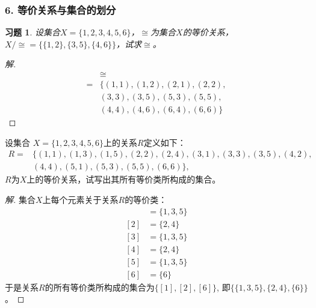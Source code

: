 \documentclass{beamer}
\newtheorem*{Exercise}{习题}
\begin{document}
\begin{CJK*}{UTF8}{gbsn}
\begin{frame}
\end{frame}
\begin{frame}
  \frametitle{6. 等价关系与集合的划分}
  \begin{Exercise}
    设集合$X=\{1,2,3,4,5,6\}$，$\cong$为集合$X$的等价关系，$X/\cong=\{\{1,2\},\{3,5\},\{4,6\}\}$，试求$\cong$。
  \end{Exercise}\pause
  \begin{proof}[解]
    \begin{align*}
      &\cong\\
      =&\{(1,1),(1,2),(2,1),(2,2),\\
      &(3,3),(3,5),(5,3),(5,5),\\
      &(4,4),(4,6),(6,4),(6,6)\}
    \end{align*}
  \end{proof}
\end{frame}
\begin{frame}
  \begin{Ex}
    设集合
    $X=\{1,2,3,4,5,6 \}$上的关系$R$定义如下：
    \begin{align*}
      R=&\{(1,1),(1,3),(1,5),(2,2),(2,4),(3,1),(3,3),(3,5),(4,2),\\
      &(4,4),(5,1),(5,3),(5,5),(6,6)\},
    \end{align*}
      $R$为$X$上的等价关系，试写出其所有等价类所构成的集合。
    \end{Ex}
    {\small
    \begin{proof}[解]
      集合$X$上每个元素关于关系$R$的等价类：
      \begin{align*}
        [1]&=\{1,3,5\}\\
        [2]&=\{2,4\}\\
        [3]&=\{1,3,5\}\\
        [4]&=\{2,4\}\\
        [5]&=\{1,3,5\}\\
        [6]&=\{6\}
      \end{align*}
      于是关系$R$的所有等价类所构成的集合为$\{[1],[2],[6]\}$, 即$\{\{1,3,5\},\{2,4\},\{6\}\}$。
    \end{proof}
    }
\end{frame}


\end{CJK*}
\end{document}
